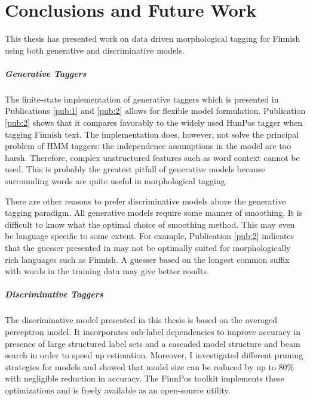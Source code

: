 \chapter{Conclusions and Future Work}
\label{chapter:conclusions}

This thesis has presented work on data driven morphological tagging
for Finnish using both generative and discriminative models.

\paragraph{Generative Taggers} The finite-state implementation of
generative taggers which is presented in Publications \ref{pub:1} and
\ref{pub:2} allows for flexible model formulation. Publication
\ref{pub:2} shows that it compares favorably to the widely used HunPos
tagger when tagging Finnish text. The implementation does, however,
not solve the principal problem of HMM taggers: the independence
assumptions in the model are too harsh. Therefore, complex
unstructured features such as word context cannot be used. This is
probably the greatest pitfall of generative models because surrounding
words are quite useful in morphological tagging.

There are other reasons to prefer discriminative models above the
generative tagging paradigm. All generative models require some manner
of smoothing. It is difficult to know what the optimal choice of
smoothing method. This may even be language specific to some
extent. For example, Publication \ref{pub:2} indicates that the
guesser presented in \cite{Brants2000} may not be optimally suited for
morphologically rich languages such as Finnish. A guesser based on the
longest common suffix with words in the training data may give better
results.

\paragraph{Discriminative Taggers} The discriminative model presented
in this thesis is based on the averaged perceptron model. It
incorporates sub-label dependencies to improve accuracy in presence of
large structured label sets and a cascaded model structure and beam
search in order to speed up estimation. Moreover, I investigated
different pruning strategies for models and showed that model size can
be reduced by up to 80\% with negligible reduction in accuracy. The
FinnPos toolkit implements these optimizations and is freely available
as an open-source utility.

